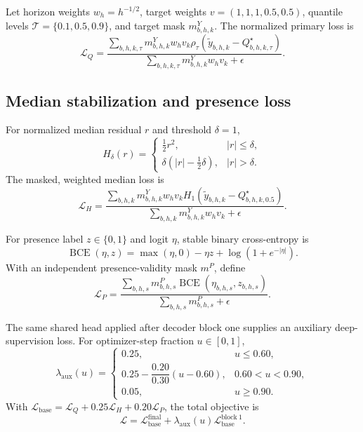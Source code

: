 \documentclass[10pt,letterpaper]{article}
\numberwithin{equation}{section}
\theoremstyle{definition}
\theoremstyle{remark}
\begin{document}
Let horizon weights $w_h=h^{-1/2}$, target weights
$v=(1,1,1,0.5,0.5)$, quantile levels
$\mathcal T=\{0.1,0.5,0.9\}$, and target mask $m^Y_{b,h,k}$. The normalized
primary loss is
\begin{equation}
\mathcal L_Q=
\frac{\sum_{b,h,k,\tau}m^Y_{b,h,k}w_hv_k
\rho_\tau(\widetilde y_{b,h,k}-Q^\star_{b,h,k,\tau})}
{\sum_{b,h,k,\tau}m^Y_{b,h,k}w_hv_k+\epsilon}.
\label{eq:weighted-pinball}
\end{equation}

\subsection{Median stabilization and presence loss}

For normalized median residual $r$ and threshold $\delta=1$,
\begin{equation}
H_\delta(r)=
\begin{cases}
\tfrac12r^2,&|r|\le\delta,\\
\delta(|r|-\tfrac12\delta),&|r|>\delta.
\end{cases}
\label{eq:huber}
\end{equation}
The masked, weighted median loss is
\begin{equation}
\mathcal L_H=
\frac{\sum_{b,h,k}m^Y_{b,h,k}w_hv_k
H_1(\widetilde y_{b,h,k}-Q^\star_{b,h,k,0.5})}
{\sum_{b,h,k}m^Y_{b,h,k}w_hv_k+\epsilon}.
\label{eq:median-huber}
\end{equation}

For presence label $z\in\{0,1\}$ and logit $\eta$, stable binary
cross-entropy is
\begin{equation}
\operatorname{BCE}(\eta,z)=
\max(\eta,0)-\eta z+\log(1+e^{-|\eta|}).
\label{eq:bce-scalar}
\end{equation}
With an independent presence-validity mask $m^P$, define
\begin{equation}
\mathcal L_P=
\frac{\sum_{b,h,s}m^P_{b,h,s}
\operatorname{BCE}(\eta_{b,h,s},z_{b,h,s})}
{\sum_{b,h,s}m^P_{b,h,s}+\epsilon}.
\label{eq:presence-loss}
\end{equation}

The same shared head applied after decoder block one supplies an auxiliary
deep-supervision loss. For optimizer-step fraction $u\in[0,1]$,
\begin{equation}
\lambda_{\mathrm{aux}}(u)=
\begin{cases}
0.25,&u\le0.60,\\
0.25-\dfrac{0.20}{0.30}(u-0.60),&0.60<u<0.90,\\
0.05,&u\ge0.90.
\end{cases}
\label{eq:aux-schedule}
\end{equation}
With $\mathcal L_{\mathrm{base}}=\mathcal L_Q+0.25\mathcal L_H
+0.20\mathcal L_P$, the total objective is
\begin{equation}
\mathcal L=\mathcal L_{\mathrm{base}}^{\mathrm{final}}
+\lambda_{\mathrm{aux}}(u)\mathcal L_{\mathrm{base}}^{\mathrm{block\ 1}}.
\label{eq:total-loss}
\end{equation}
\end{document}
